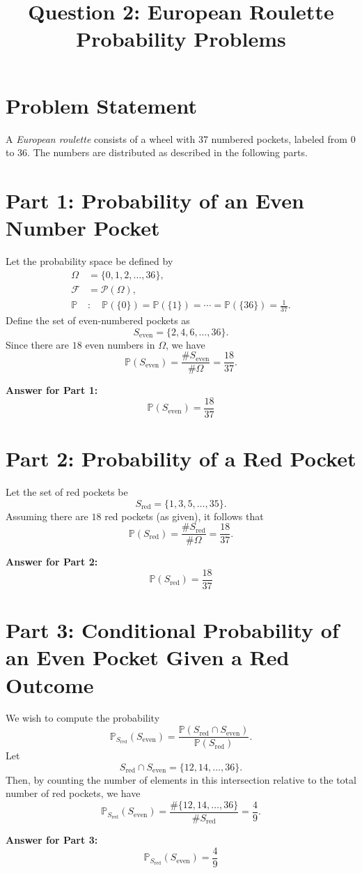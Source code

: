 \documentclass[12pt]{article}
\title{Question 2: European Roulette Probability Problems}
\author{}
\date{}
\begin{document}
\maketitle
\onehalfspacing

\section*{Problem Statement}
A \emph{European roulette} consists of a wheel with 37 numbered pockets, labeled from $0$ to $36$. The numbers are distributed as described in the following parts.

\bigskip

\section*{Part 1: Probability of an Even Number Pocket}
Let the probability space be defined by
\[
\begin{aligned}
\Omega &= \{0,1,2,\dots,36\},\\[1mm]
\mathcal{F} &= \mathcal{P}(\Omega),\\[1mm]
\mathbb{P} &:\quad \mathbb{P}(\{0\}) = \mathbb{P}(\{1\}) = \cdots = \mathbb{P}(\{36\}) = \frac{1}{37}.
\end{aligned}
\]
Define the set of even-numbered pockets as
\[
S_{\mathrm{even}} = \{2,4,6,\dots,36\}.
\]
Since there are $18$ even numbers in $\Omega$, we have
\[
\mathbb{P}(S_{\mathrm{even}}) = \frac{\# S_{\mathrm{even}}}{\# \Omega} = \frac{18}{37}.
\]

\medskip

\textbf{Answer for Part 1:} 
\[
\boxed{\mathbb{P}(S_{\mathrm{even}}) = \frac{18}{37}}
\]

\bigskip

\section*{Part 2: Probability of a Red Pocket}
Let the set of red pockets be
\[
S_{\mathrm{red}} = \{1,3,5,\dots,35\}.
\]
Assuming there are $18$ red pockets (as given), it follows that
\[
\mathbb{P}(S_{\mathrm{red}}) = \frac{\# S_{\mathrm{red}}}{\# \Omega} = \frac{18}{37}.
\]

\medskip

\textbf{Answer for Part 2:} 
\[
\boxed{\mathbb{P}(S_{\mathrm{red}}) = \frac{18}{37}}
\]

\bigskip

\section*{Part 3: Conditional Probability of an Even Pocket Given a Red Outcome}
We wish to compute the probability
\[
\mathbb{P}_{S_{\mathrm{red}}}(S_{\mathrm{even}}) = \frac{\mathbb{P}(S_{\mathrm{red}} \cap S_{\mathrm{even}})}{\mathbb{P}(S_{\mathrm{red}})}.
\]
Let 
\[
S_{\mathrm{red}} \cap S_{\mathrm{even}} = \{12,14,\dots,36\}.
\]
Then, by counting the number of elements in this intersection relative to the total number of red pockets, we have
\[
\mathbb{P}_{S_{\mathrm{red}}}(S_{\mathrm{even}}) = \frac{\#\{12,14,\dots,36\}}{\# S_{\mathrm{red}}} = \frac{4}{9}.
\]

\medskip

\textbf{Answer for Part 3:} 
\[
\boxed{\mathbb{P}_{S_{\mathrm{red}}}(S_{\mathrm{even}}) = \frac{4}{9}}
\]
\end{document}
